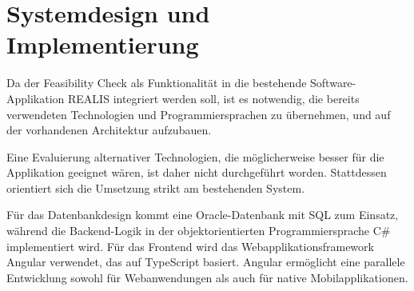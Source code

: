 \chapter{Systemdesign und Implementierung}

Da der Feasibility Check als Funktionalität in die bestehende Software-Applikation \gls{REALIS} integriert werden soll, ist es notwendig, die bereits verwendeten Technologien und Programmiersprachen zu übernehmen, und auf der vorhandenen Architektur aufzubauen.

Eine Evaluierung alternativer Technologien, die möglicherweise besser für die Applikation geeignet wären, ist daher nicht durchgeführt worden. Stattdessen orientiert sich die Umsetzung strikt am bestehenden System.

Für das Datenbankdesign kommt eine Oracle-Datenbank mit SQL zum Einsatz, während die Backend-Logik in der objektorientierten Programmiersprache C\# implementiert wird. Für das Frontend wird das Webapplikationsframework Angular verwendet, das auf TypeScript basiert. Angular ermöglicht eine parallele Entwicklung sowohl für Web\-anwendungen als auch für native Mobilapplikationen.













